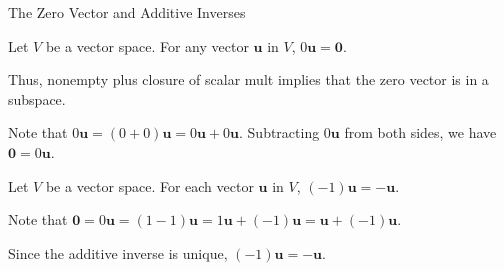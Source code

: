 \documentclass[xcolor=dvipsnames,aspectratio=169,t]{beamer}
\begin{document}
\begin{frame}{The Zero Vector and Additive Inverses}
  \begin{theorem}
    Let $V$ be a vector space.  For any vector $\mathbf{u}$ in $V$, $0\mathbf{u}=\mathbf{0}$.
  \end{theorem}
  Thus, nonempty plus closure of scalar mult implies that the zero vector is in a subspace.
  \medskip
  
  \pause
   Note that $0\mathbf{u}=(0+0)\mathbf{u}=0\mathbf{u}+0\mathbf{u}$.
  Subtracting $0\mathbf{u}$ from both sides, we have $\mathbf{0}=0\mathbf{u}$.
  \bigskip
  
  \pause
  \begin{theorem}
    Let $V$ be a vector space.  For each vector $\mathbf{u}$ in $V$, $(-1)\mathbf{u}=-\mathbf{u}$.
  \end{theorem}
  
  \pause
   Note that $\mathbf{0}=0\mathbf{u}=(1-1)\mathbf{u}=1\mathbf{u}+(-1)\mathbf{u}=\mathbf{u}+(-1)\mathbf{u}$.
  \smallskip
  
  Since the additive inverse is unique, $(-1)\mathbf{u}=-\mathbf{u}$.
\end{frame}
\end{document}
